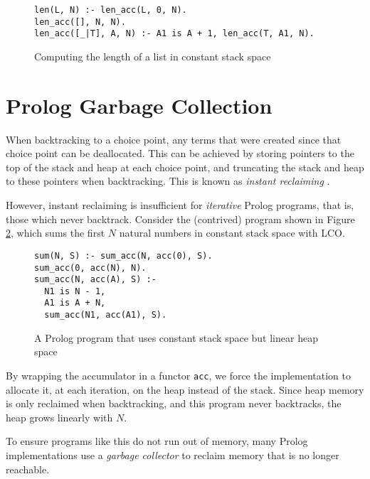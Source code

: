 \begin{figure}[H]
\begin{center}
\begin{verbatim}
len(L, N) :- len_acc(L, 0, N).
len_acc([], N, N).
len_acc([_|T], A, N) :- A1 is A + 1, len_acc(T, A1, N).
\end{verbatim}
\end{center}
\caption{Computing the length of a list in constant stack space}
\label{fig:lco}
\end{figure}

\section{Prolog Garbage Collection}

\label{sec:prolog-gc}

When backtracking to a choice point, any terms that were created since that choice point can be deallocated. This can be achieved by storing pointers to the top of the stack and heap at each choice point, and truncating the stack and heap to these pointers when backtracking. This is known as \emph{instant reclaiming} \cite{bekkersDynamicMemoryManagement1992}.

However, instant reclaiming is insufficient for \emph{iterative} Prolog programs, that is, those which never backtrack. Consider the (contrived) program shown in Figure \ref{fig:iterative}, which sums the first $N$ natural numbers in constant stack space with LCO.

\begin{figure}[H]
\begin{center}
\begin{verbatim}
sum(N, S) :- sum_acc(N, acc(0), S).
sum_acc(0, acc(N), N).
sum_acc(N, acc(A), S) :-
  N1 is N - 1,
  A1 is A + N,
  sum_acc(N1, acc(A1), S).
\end{verbatim}
\end{center}
\caption{A Prolog program that uses constant stack space but linear heap space}
\label{fig:iterative}
\end{figure}

By wrapping the accumulator in a functor \texttt{acc}, we force the implementation to allocate it, at each iteration, on the heap instead of the stack. Since heap memory is only reclaimed when backtracking, and this program never backtracks, the heap grows linearly with $N$.

To ensure programs like this do not run out of memory, many Prolog implementations use a \emph{garbage collector} to reclaim memory that is no longer reachable.


